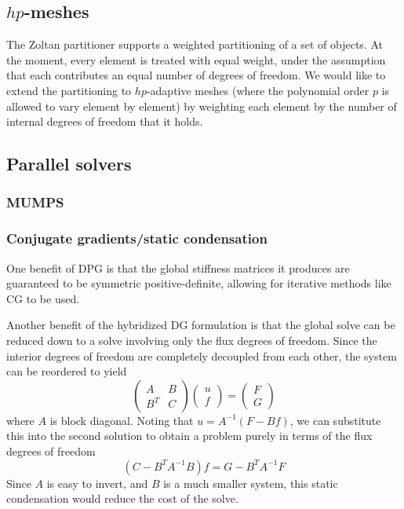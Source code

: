 \documentclass{article}
\begin{document}
\subsection{$hp$-meshes}

The Zoltan partitioner supports a weighted partitioning of a set of objects.  At the moment, every element is treated with equal weight, under the assumption that each contributes an equal number of degrees of freedom.  We would like to extend the partitioning to $hp$-adaptive meshes (where the polynomial order $p$ is allowed to vary element by element) by weighting each element by the number of internal degrees of freedom that it holds.  

\subsection{Parallel solvers}
\subsubsection{MUMPS}

\subsubsection{Conjugate gradients/static condensation}

One benefit of DPG is that the global stiffness matrices it produces are guaranteed to be symmetric positive-definite, allowing for iterative methods like CG to be used. 

Another benefit of the hybridized DG formulation is that the global solve can be reduced down to a solve involving only the flux degrees of freedom. Since the interior degrees of freedom are completely decoupled from each other, the system can be reordered to yield 
\[
\left(\begin{array}{cc}
A &B\\
B^T &C
\end{array}
\right)
\left(\begin{array}{c}
u\\
f
\end{array}
\right) = 
\left(\begin{array}{c}
F\\
G
\end{array}
\right)
\]
where $A$ is block diagonal. Noting that $u = A^{-1}(F-Bf)$, we can substitute this into the second solution to obtain a problem purely in terms of the flux degrees of freedom
\[
(C-B^TA^{-1}B)f = G-B^TA^{-1}F
\]
Since $A$ is easy to invert, and $B$ is a much smaller system, this static condensation would reduce the cost of the solve.



\end{document}
